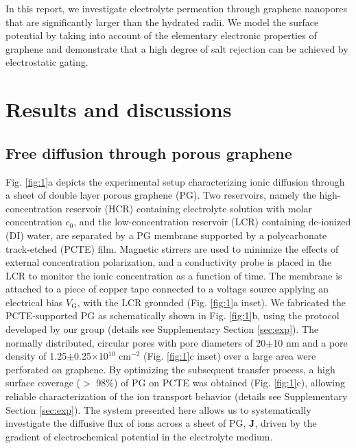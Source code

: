 \documentclass[journal=langd5,email=true, hyperref=true, keywords=false]{achemso}
\begin{document}
In this report, we
investigate electrolyte permeation through graphene nanopores that are
significantly larger than the hydrated radii. We model the surface
potential by taking into account of the elementary electronic
properties of graphene and demonstrate that a high degree of salt
rejection can be achieved by electrostatic gating.

\section*{Results and discussions}
\label{sec:res}

\subsection*{Free diffusion through porous graphene}
\label{sec:res-1}

Fig. \ref{fig:1}a depicts the experimental setup characterizing
ionic diffusion through a sheet of double layer porous graphene
(PG). Two reservoirs, namely the high-concentration reservoir (HCR)
containing electrolyte solution with molar concentration $c_0$, and
the low-concentration reservoir (LCR) containing de-ionized (DI)
water, are separated by a PG membrane supported by a polycarbonate
track-etched (PCTE) film. Magnetic stirrers are used to minimize the
effects of external concentration polarization, and a conductivity
probe is placed in the LCR to monitor the ionic concentration as a
function of time. The membrane is attached to a piece of copper tape
connected to a voltage source applying an electrical bias
$V_{\mathrm{G}}$, with the LCR grounded (Fig. \ref{fig:1}a
inset). We fabricated the PCTE-supported PG as schematically shown in
Fig. \ref{fig:1}b, using the protocol developed by our group
\cite{Choi_2018} (details see Supplementary Section
\ref{sec:exp}). The normally distributed, circular pores with pore
diameters of 20$\pm$10 nm and a pore density of
1.25$\pm$0.25$\times$10$^{10}$ cm$^{-2}$ (Fig. \ref{fig:1}c inset)
over a large area were perforated on graphene.  By optimizing the
subsequent transfer process, a high surface coverage ($>$ 98\%) of PG
on PCTE was obtained (Fig. \ref{fig:1}c), allowing reliable
characterization of the ion transport behavior (details see
Supplementary Section \ref{sec:exp}).  The system presented here
allows us to systematically investigate the diffusive flux of ions
across a sheet of PG, $\boldsymbol{J}$, driven by the gradient of
electrochemical potential in the electrolyte medium.
\end{document}
